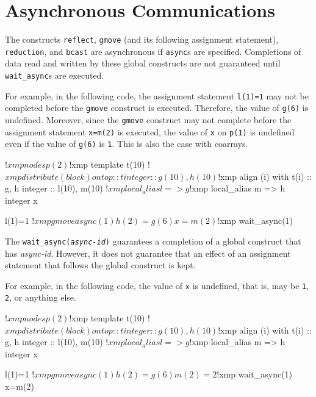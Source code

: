 \section{Asynchronous Communications}

The constructs \texttt{reflect}, \texttt{gmove} (and its following
assignment statement), \texttt{reduction}, and \texttt{bcast} are asynchronous
if \texttt{async}s are specified.  Completions of data read and
written by these global constructs are not guaranteed until
\texttt{wait\_async}s are executed.

For example, in the following code, the assignment statement \texttt{l(1)=1} may
not be completed before the \texttt{gmove} construct is executed.
Therefore, the value of \texttt{g(6)} is undefined.  Moreover, since
the \texttt{gmove} construct may not complete before the assignment statement
\texttt{x=m(2)} is executed, the value of \texttt{x} on \texttt{p(1)}
is undefined even if the value of \texttt{g(6)} is \texttt{1}.  This
is also the case with coarrays.
\begin{center}
\begin{XFexample}
!$xmp nodes p(2)
!$xmp template t(10)
!$xmp distribute (block) onto p :: t
      integer :: g(10), h(10)
!$xmp align (i) with t(i) :: g, h
      integer :: l(10), m(10)
!$xmp local_alias l => g
!$xmp local_alias m => h
      integer x

      l(1)=1
!$xmp gmove async(1)
      h(2)=g(6)
      x=m(2)
!$xmp wait_async(1)
\end{XFexample}
\end{center}

The \texttt{wait\_async(\textit{async-id})} guarantees a completion of
a global construct that has \textit{async-id}.  However, it does not
guarantee that an effect of an assignment statement that follows the global
construct is kept.

For example, in the following code, the value of \texttt{x} is
undefined, that is, may be \texttt{1}, \texttt{2}, or anything else.
\begin{center}
\begin{XFexample}
!$xmp nodes p(2)
!$xmp template t(10)
!$xmp distribute (block) onto p :: t
      integer :: g(10), h(10)
!$xmp align (i) with t(i) :: g, h
      integer :: l(10), m(10)
!$xmp local_alias l => g
!$xmp local_alias m => h
      integer x

      l(1)=1
!$xmp gmove async(1)
      h(2)=g(6)
      m(2)=2
!$xmp wait_async(1)
      x=m(2)
\end{XFexample}
\end{center}



%


